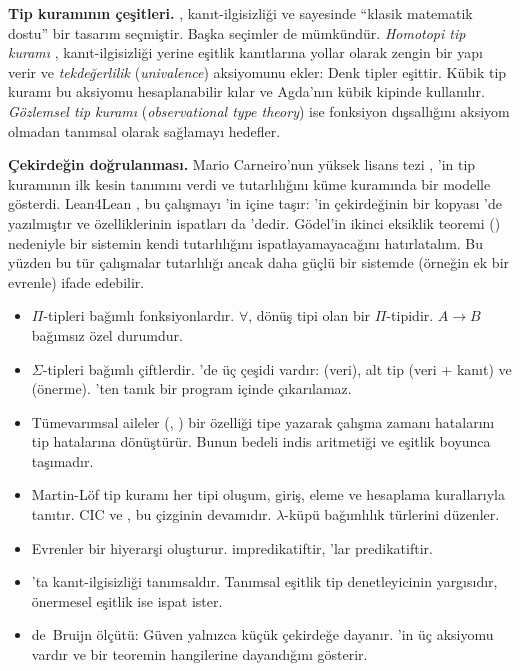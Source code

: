 \begin{arastirmanotu}
\textbf{Tip kuramının çeşitleri.} \Lean{}, kanıt-ilgisizliği ve
 sayesinde ``klasik matematik dostu'' bir tasarım seçmiştir.
Başka seçimler de mümkündür. \emph{Homotopi tip kuramı} \citep{hott2013},
kanıt-ilgisizliği yerine eşitlik kanıtlarına yollar olarak zengin bir yapı
verir ve \emph{tekdeğerlilik} (\emph{univalence}) aksiyomunu ekler:
Denk tipler eşittir. Kübik tip kuramı bu aksiyomu hesaplanabilir kılar ve
Agda'nın kübik kipinde kullanılır. \emph{Gözlemsel tip kuramı}
(\emph{observational type theory}) ise fonksiyon dışsallığını aksiyom
olmadan tanımsal olarak sağlamayı hedefler.

\textbf{Çekirdeğin doğrulanması.} Mario Carneiro'nun yüksek lisans tezi
\citep{carneiro2019}, \Lean{}'in tip kuramının ilk kesin tanımını verdi ve
tutarlılığını küme kuramında bir modelle gösterdi. Lean4Lean
\citep{carneiro2026}, bu çalışmayı \Lean{}'in içine taşır: \Lean{}'in
çekirdeğinin bir kopyası \Lean{}'de yazılmıştır ve özelliklerinin
ispatları da \Lean{}'dedir. Gödel'in ikinci eksiklik teoremi ()
nedeniyle bir sistemin kendi tutarlılığını ispatlayamayacağını
hatırlatalım. Bu yüzden bu tür çalışmalar tutarlılığı ancak daha güçlü bir
sistemde (örneğin ek bir evrenle) ifade edebilir.
\end{arastirmanotu}

\begin{bolumozeti}
\begin{itemize}
  \item $Π$-tipleri bağımlı fonksiyonlardır. $\forall$, dönüş tipi
         olan bir $Π$-tipidir. $A \to B$ bağımsız özel
        durumdur.
  \item $Σ$-tipleri bağımlı çiftlerdir. \Lean{}'de üç çeşidi vardır:
         (veri), alt tip (veri + kanıt) ve  (önerme).
        'ten tanık bir program içinde çıkarılamaz.
  \item Tümevarımsal aileler (, ) bir özelliği tipe
        yazarak çalışma zamanı hatalarını tip hatalarına dönüştürür. Bunun
        bedeli indis aritmetiği ve eşitlik boyunca taşımadır.
  \item Martin-Löf tip kuramı her tipi oluşum, giriş, eleme ve hesaplama
        kurallarıyla tanıtır. CIC ve \Lean{}, bu çizginin
        devamıdır. $\lambda$-küpü bağımlılık türlerini düzenler.
  \item Evrenler bir hiyerarşi oluşturur.  impredikatiftir,
        'lar predikatiftir.
  \item {}'ta kanıt-ilgisizliği tanımsaldır. Tanımsal eşitlik tip
        denetleyicinin yargısıdır, önermesel eşitlik ise ispat ister.
  \item de~Bruijn ölçütü: Güven yalnızca küçük çekirdeğe dayanır.
        \Lean{}'in üç aksiyomu vardır ve   bir
        teoremin hangilerine dayandığını gösterir.
\end{itemize}
\end{bolumozeti}

